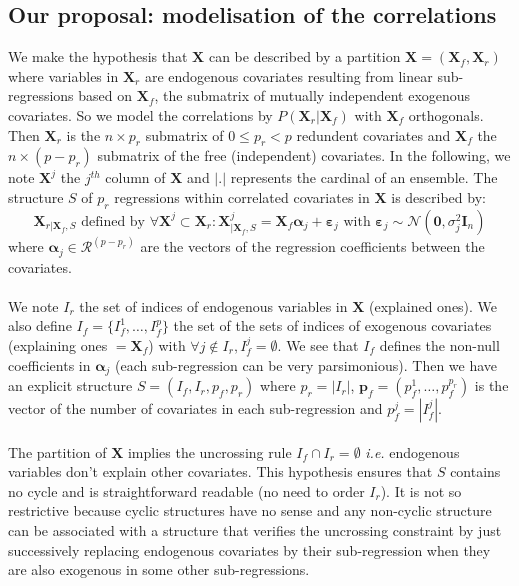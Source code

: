 \documentclass[11pt,a4paper]{article}
\begin{document}
\subsection{Our proposal: modelisation of the correlations}
We make the hypothesis that $\boldsymbol{X}$ can be described by a partition $\boldsymbol{X}=(\boldsymbol{X}_f,\boldsymbol{X}_r) $ where variables in $\boldsymbol{X}_r$ are endogenous covariates resulting from linear sub-regressions based on $\boldsymbol{X}_f$, the submatrix of mutually independent exogenous covariates.
So we model the correlations by $P(\boldsymbol{X}_r|\boldsymbol{X}_f) $ with $\boldsymbol{X}_f$ orthogonals.
 Then $\boldsymbol{X}_r$ is the $n\times p_r$ submatrix of $0\leq p_r <p$ redundent covariates and $\boldsymbol{X}_f$ the $n\times (p-p_r)$ submatrix of the free (independent) covariates.
In the following, we note $\boldsymbol{X}^j$ the $j^{th}$ column of $\boldsymbol{X}$ and $|.|$ represents the cardinal of an ensemble.
The structure $S$ of $p_r$ regressions within correlated covariates in $\boldsymbol{X}$ is described by:
	\begin{equation}
		\boldsymbol{X}_{r|\boldsymbol{X}_f,S} \textrm{ defined by }\forall \boldsymbol{X}^j \subset \boldsymbol{X}_r: \boldsymbol{X}^j_{|\boldsymbol{X}_f,S}=\boldsymbol{X}_f\boldsymbol{\alpha}_j+\boldsymbol{\varepsilon}_j \textrm{ with } \boldsymbol{\varepsilon}_j \sim\mathcal{N}(\boldsymbol{0},\sigma^2_j\boldsymbol{I}_n) \label{SR}
	\end{equation}
		where $\boldsymbol{\alpha}_j \in \mathcal{R}^{(p-p_r)}$ are the vectors of the regression coefficients between the covariates. 
\\
\\
We note $I_r$ the set of indices of endogenous variables in $\boldsymbol{X}$ (explained ones).
We also define $I_f=\{I_f^1,\dots,I_f^p \}$ the set of the sets of indices of exogenous covariates (explaining ones $=\boldsymbol{X}_f$) with $\forall j \notin I_r, I_f^j=\emptyset$. 
We see that $I_f$ defines the non-null coefficients in $\boldsymbol{\alpha}_j$ (each sub-regression can be very parsimonious).
Then we have an explicit structure $S=(I_f,I_r,p_f,p_r)$ where $p_r=|I_r|$, $\boldsymbol{p}_f=(p_f^1,\dots,p_f^{p_r})$ is the vector of the number of covariates in each sub-regression  and $p_f^j=|I_f^j|$. 
\\
\\

The partition of $\boldsymbol{X}$ implies the uncrossing rule $I_f\cap I_r=\emptyset$ {\it i.e.} endogenous variables don't explain other covariates. This hypothesis ensures that $S$ contains no cycle and is straightforward readable (no need to order $I_r$). It is not so restrictive because cyclic structures have no sense and any non-cyclic structure can be associated with a structure that verifies the uncrossing constraint by just successively replacing endogenous covariates by their sub-regression when they are also exogenous in some other sub-regressions.
\end{document}
